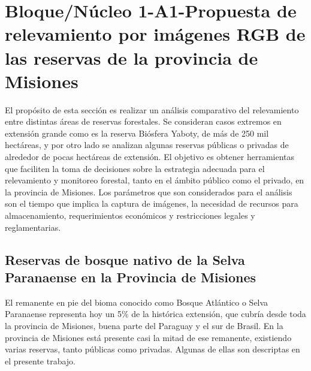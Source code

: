 

\section {Bloque/Núcleo 1-A1-Propuesta de relevamiento por imágenes RGB de las reservas de la provincia de Misiones}
El propósito de esta sección es realizar un análisis comparativo del relevamiento entre distintas áreas de reservas forestales. Se consideran casos extremos en extensión grande como es la reserva Biósfera Yaboty, de más de 250 mil hectáreas, y por otro lado se analizan algunas reservas públicas o privadas de alrededor de pocas hectáreas de extensión. El objetivo es obtener herramientas que faciliten la toma de decisiones sobre la estrategia adecuada para el relevamiento y monitoreo forestal, tanto en el ámbito público como el privado, en la provincia de Misiones. Los parámetros que son considerados para el análisis son el tiempo que implica la captura de imágenes, la necesidad de recursos para almacenamiento, requerimientos económicos y restricciones legales y reglamentarias.
\subsection{Reservas de bosque nativo de la Selva Paranaense en la Provincia de Misiones}
El remanente en pie del bioma conocido como Bosque Atlántico o Selva Paranaense representa hoy un 5\% de la histórica extensión, que cubría desde toda la provincia de Misiones, buena parte del Paraguay y el sur de Brasil. En la provincia de Misiones está presente casi la mitad de ese remanente, existiendo varias reservas, tanto públicas como privadas. Algunas de ellas son descriptas en el presente trabajo.
